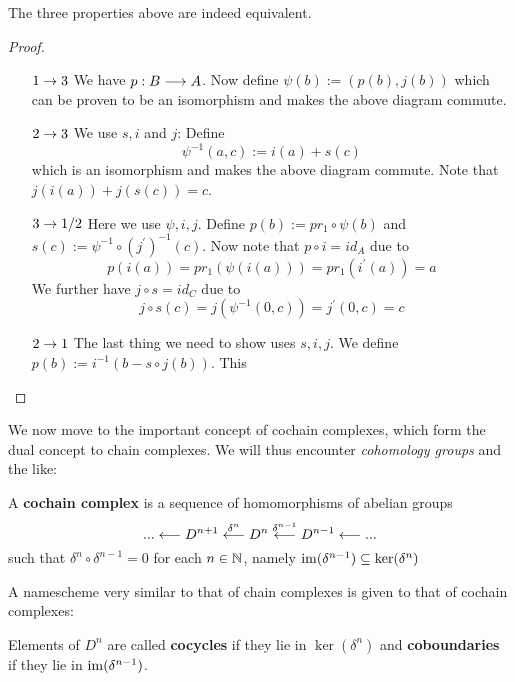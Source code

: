 \begin{lem}
  The three properties above are indeed equivalent.

\begin{proof}~
\begin{itemize}
  \item[$1\rightarrow 3$]  We have $p:B \longrightarrow A$. Now define $\psi(b):= (p(b),j(b))$ which can be proven to be an isomorphism and makes the above diagram commute.

  \item[$2\rightarrow 3$] We use $s,i$ and $j$: Define
  $$ \psi^{-1}(a,c) := i(a)+s(c) $$
  which is an isomorphism and makes the above diagram commute. Note that $j(i(a)) + j(s(c)) = c$.

  \item[$3\rightarrow 1/2$] Here we use $\psi,i,j$. Define $p(b):= pr_1 \circ \psi(b)$ and $s(c):= \psi^{-1}\circ (j^\prime)^{-1}(c)$. Now note that $p \circ i = id_A$ due to
  $$ p(i(a)) = pr_1(\psi(i(a))) = pr_1(i^\prime(a)) = a $$
  We further have $j \circ s = id_C$ due to
  $$ j \circ s(c) = j(\psi^{-1}(0,c)) = j^\prime(0,c) = c $$

  \item[$2\rightarrow 1$] The last thing we need to show uses $s,i,j$. We define $p(b) := i^{-1}(b - s\circ j(b))$. This
\end{itemize}
\end{proof}
\end{lem}

We now move to the important concept of cochain complexes, which form the dual concept to chain complexes. We will thus encounter \emph{cohomology groups} and the like:

\begin{definition}
  A \textbf{cochain complex} is a sequence of homomorphisms of abelian groups
  $$ ... \longleftarrow D^{n+1} \overset{\delta^n}{\longleftarrow} D^n \overset{\delta^{n-1}}{\longleftarrow} D^{n-1} \longleftarrow ... $$
  such that $\delta^n \circ \delta^{n-1} = 0$ for each $n\in \mathbb{N}$, namely $\operatorname{im} (\delta^{n-1}) \subseteq \ker (\delta^n)$
\end{definition}

A namescheme very similar to that of chain complexes is given to that of cochain complexes:

\begin{definition}
  Elements of $D^n$ are called \textbf{cocycles} if they lie in $\ker(\delta^n)$ and \textbf{coboundaries} if they lie in $\operatorname{im}(\delta^{n-1})$.
\end{definition}

